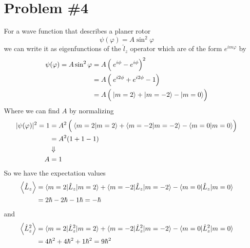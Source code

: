 \documentclass[11pt]{article}
\numberwithin{equation}{section}
\begin{document}
\section{Problem \#4}
For a wave function that describes a planer rotor 
$$\psi(\varphi) = A\sin^2\varphi$$ 
we can write it as eigenfunctions of the $\hat{l}_z$ operator which are of the form 
$e^{im\varphi}$ by
\begin{align*}
\psi(\varphi) = A\sin^2\varphi &= A\left(\frac{}{}e^{i\phi}-e^{i\phi}\right)^2\\
&= A\left(\frac{}{}e^{i2\phi}+e^{i2\phi}-1\right)\\
&= A\left(\frac{}{}|{m=2}\rangle+|{m=-2}\rangle-|{m=0}\rangle\right)
\end{align*}
Where we can find $A$ by normalizing
\begin{align*}
|\psi(\varphi)|^2 = 1 &= A^2\left(\frac{}{}\langle{m=2}|{m=2}\rangle+\langle{m=-2}|{m=-2}\rangle-\langle{m=0}|{m=0}\rangle\right)\\
&= A^2(1+1-1)\\
&\Downarrow\\
A &= 1
\end{align*}
So we have the expectation values
\begin{align*}
\left\langle\hat{L}_z\right\rangle &= \langle{m=2}|\hat{L}_z|{m=2}\rangle+\langle{m=-2}|\hat{L}_z|{m=-2}\rangle-\langle{m=0}|\hat{L}_z|{m=0}\rangle\\
&= 2\hbar - 2\hbar - 1\hbar = -\hbar
\end{align*}
and
\begin{align*}
\left\langle\hat{L}_z^2\right\rangle &= \langle{m=2}|\hat{L}^2_z|{m=2}\rangle+\langle{m=-2}|\hat{L}^2_z|{m=-2}\rangle-\langle{m=0}|\hat{L}^2_z|{m=0}\rangle\\
&= 4\hbar^2 + 4\hbar^2 + 1\hbar^2 = 9\hbar^2
\end{align*}
\end{document}
